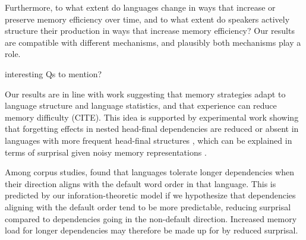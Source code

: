 Furthermore, to what extent do languages change in ways that increase or preserve memory efficiency over time, and to what extent do speakers actively structure their production in ways that increase memory efficiency?
Our results are compatible with different mechanisms, and plausibly both mechanisms play a role.




interesting Qs to mention?



Our results are in line with work suggesting that memory strategies adapt to language structure and language statistics, and that experience can reduce memory difficulty (CITE).
This idea is supported by experimental work showing that forgetting effects in nested head-final dependencies are reduced or absent in languages with more frequent head-final structures  \cite{MacDonald  Christiansen, 2002, Christiansen  Chater, 1999; Christiansen  MacDonald, 2009; Engelmann  Vasishth, 2009, Frank  Ernst,
2019; Frank et al., 2016; Husain  Bhatia, 2018; Vasishth et al., 2010}
, which can be explained in terms of surprisal given noisy memory representations \cite{futrell-noisy-context-2017}.


Among corpus studies, \cite{yadav2020word} found that languages tolerate longer dependencies when their direction aligns with the default word order in that language. This is predicted by our inforation-theoretic model if we hypothesize that dependencies aligning with the default order tend to be more predictable, reducing surprisal compared to dependencies going in the non-default direction. Increased memory load for longer dependencies may therefore be made up for by reduced surprisal.



